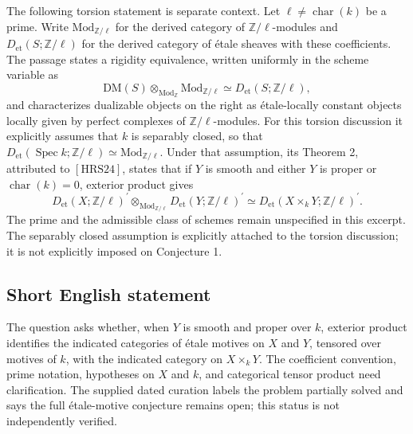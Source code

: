 \documentclass[11pt]{article}
\newcommand{\Z}{\mathbb{Z}}
\begin{document}
The following torsion statement is separate context. Let \(\ell\ne\operatorname{char}(k)\) be a prime. Write \(\mathrm{Mod}_{\Z/\ell}\) for the derived category of \(\Z/\ell\)-modules and \(D_{\mathrm{et}}(S;\Z/\ell)\) for the derived category of étale sheaves with these coefficients. The passage states a rigidity equivalence, written uniformly in the scheme variable as
\[
\mathrm{DM}(S)\otimes_{\mathrm{Mod}_{\Z}}\mathrm{Mod}_{\Z/\ell}
\simeq D_{\mathrm{et}}(S;\Z/\ell),
\]
and characterizes dualizable objects on the right as étale-locally constant objects locally given by perfect complexes of \(\Z/\ell\)-modules. For this torsion discussion it explicitly assumes that \(k\) is separably closed, so that
\(D_{\mathrm{et}}(\operatorname{Spec}k;\Z/\ell)\simeq\mathrm{Mod}_{\Z/\ell}\).
Under that assumption, its Theorem 2, attributed to \([\mathrm{HRS24}]\), states that if \(Y\) is smooth and either \(Y\) is proper or \(\operatorname{char}(k)=0\), exterior product gives
\[
D_{\mathrm{et}}(X;\Z/\ell)^{\prime}
\otimes_{\mathrm{Mod}_{\Z/\ell}}
D_{\mathrm{et}}(Y;\Z/\ell)^{\prime}
\simeq D_{\mathrm{et}}(X\times_kY;\Z/\ell)^{\prime}.
\]
The prime and the admissible class of schemes remain unspecified in this excerpt. The separably closed assumption is explicitly attached to the torsion discussion; it is not explicitly imposed on Conjecture 1.
\subsection{Short English statement}
The question asks whether, when \(Y\) is smooth and proper over \(k\), exterior product identifies the indicated categories of étale motives on \(X\) and \(Y\), tensored over motives of \(k\), with the indicated category on \(X\times_kY\). The coefficient convention, prime notation, hypotheses on \(X\) and \(k\), and categorical tensor product need clarification. The supplied dated curation labels the problem partially solved and says the full étale-motive conjecture remains open; this status is not independently verified.
\end{document}

